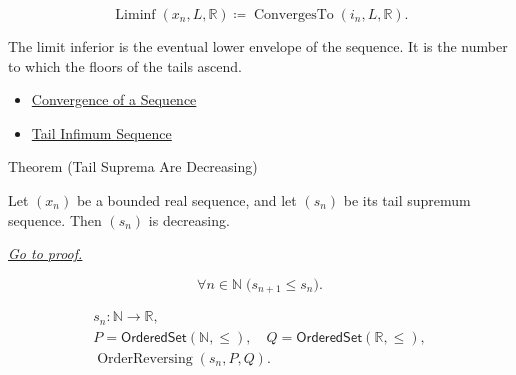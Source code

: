 \begin{remark*}
\[
\operatorname{Liminf}(x_n,L,\mathbb{R})
\coloneqq
\operatorname{ConvergesTo}(i_n,L,\mathbb{R}).
\]
\end{remark*}

\begin{remark*}[Interpretation]
The limit inferior is the eventual lower envelope of the sequence. It is the
number to which the floors of the tails ascend.
\end{remark*}

\begin{dependencies}
\begin{itemize}
  \item \hyperref[def:convergent-sequence]{Convergence of a Sequence}
  \item \hyperref[def:tail-infimum-sequence]{Tail Infimum Sequence}
\end{itemize}
\end{dependencies}


\begin{theorembox}{Theorem (Tail Suprema Are Decreasing)}
\begin{theorem}
\label{thm:tail-suprema-are-decreasing}
Let $(x_n)$ be a bounded real sequence, and let $(s_n)$ be its tail
supremum sequence. Then $(s_n)$ is decreasing.

\smallskip
\noindent
\hyperref[prf:tail-suprema-are-decreasing]{\textit{Go to proof.}}
\end{theorem}
\end{theorembox}

\begin{remark*}
\[
\forall n\in\mathbb{N}\;\bigl(s_{n+1}\le s_n\bigr).
\]
\end{remark*}

\begin{remark*}
\[
\begin{gathered}
s_n\colon\mathbb{N}\to\mathbb{R},\\
P=\mathsf{OrderedSet}(\mathbb{N},\leq),\quad
Q=\mathsf{OrderedSet}(\mathbb{R},\leq),\\
\operatorname{OrderReversing}(s_n,P,Q).
\end{gathered}
\]
\end{remark*}

